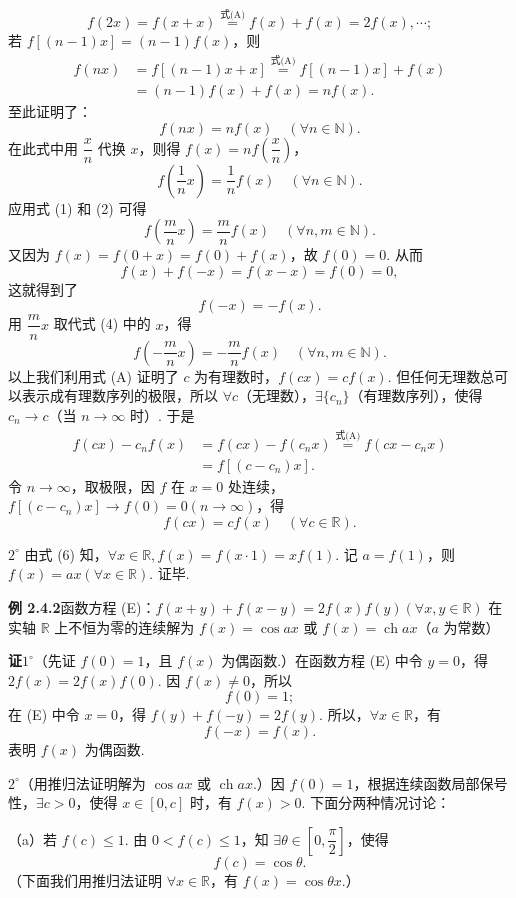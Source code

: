 \documentclass[UTF8,12pt,a4paper,fontset=fandol]{ctexart}
\begin{document}
\[
  f(2x)=f(x+x)\overset{\text{式(A)}}{=}f(x)+f(x)=2f(x),\cdots;
\]
若 $f[(n-1)x]=(n-1)f(x)$，则
\[
\begin{aligned}
f(nx)
&=f[(n-1)x+x]\overset{\text{式(A)}}{=}f[(n-1)x]+f(x)\\
&=(n-1)f(x)+f(x)=nf(x).
\end{aligned}
\]
至此证明了：
\[
  f(nx)=nf(x)\quad(\forall n\in\mathbb{N}). \tag{1}
\]
在此式中用 $\dfrac xn$ 代换 $x$，则得 $f(x)=nf\left(\dfrac xn\right)$，
\[
  f\left(\frac1nx\right)=\frac1nf(x)\quad(\forall n\in\mathbb{N}). \tag{2}
\]
应用式 (1) 和 (2) 可得
\[
  f\left(\frac mnx\right)=\frac mn f(x)\quad(\forall n,m\in\mathbb{N}). \tag{3}
\]
又因为 $f(x)=f(0+x)=f(0)+f(x)$，故 $f(0)=0$. 从而
\[
  f(x)+f(-x)=f(x-x)=f(0)=0,
\]
这就得到了
\[
  f(-x)=-f(x). \tag{4}
\]
用 $\dfrac mnx$ 取代式 (4) 中的 $x$，得
\[
  f\left(-\frac mnx\right)=-\frac mn f(x)\quad(\forall n,m\in\mathbb{N}). \tag{5}
\]
以上我们利用式 (A) 证明了 $c$ 为有理数时，$f(cx)=cf(x)$. 但任何无理数总可以表示成有理数序列的极限，所以 $\forall c$（无理数），$\exists\{c_n\}$（有理数序列），使得 $c_n\to c$（当 $n\to\infty$ 时）. 于是
\[
\begin{aligned}
f(cx)-c_nf(x)
&=f(cx)-f(c_nx)\overset{\text{式(A)}}{=}f(cx-c_nx)\\
&=f[(c-c_n)x].
\end{aligned}
\]
令 $n\to\infty$，取极限，因 $f$ 在 $x=0$ 处连续，$f[(c-c_n)x]\to f(0)=0(n\to\infty)$，得
\[
  f(cx)=cf(x)\quad(\forall c\in\mathbb{R}). \tag{6}
\]

$2^\circ$ 由式 (6) 知，$\forall x\in\mathbb{R},f(x)=f(x\cdot1)=xf(1)$. 记 $a=f(1)$，则 $f(x)=ax(\forall x\in\mathbb{R})$. 证毕.

\noindent\textbf{例 2.4.2}\quad 函数方程 (E)：$f(x+y)+f(x-y)=2f(x)f(y)(\forall x,y\in\mathbb{R})$ 在实轴 $\mathbb{R}$ 上不恒为零的连续解为 $f(x)=\cos ax$ 或 $f(x)=\operatorname{ch} ax$（$a$ 为常数）

\noindent\textbf{证}\quad $1^\circ$（先证 $f(0)=1$，且 $f(x)$ 为偶函数.）在函数方程 (E) 中令 $y=0$，得 $2f(x)=2f(x)f(0)$. 因 $f(x)\ne0$，所以
\[
  f(0)=1; \tag{1}
\]
在 (E) 中令 $x=0$，得 $f(y)+f(-y)=2f(y)$. 所以，$\forall x\in\mathbb{R}$，有
\[
  f(-x)=f(x). \tag{2}
\]
表明 $f(x)$ 为偶函数.

$2^\circ$（用推归法证明解为 $\cos ax$ 或 $\operatorname{ch} ax$.）因 $f(0)=1$，根据连续函数局部保号性，$\exists c>0$，使得 $x\in[0,c]$ 时，有 $f(x)>0$. 下面分两种情况讨论：

（a）若 $f(c)\le1$. 由 $0<f(c)\le1$，知 $\exists\theta\in\left[0,\dfrac\pi2\right]$，使得
\[
  f(c)=\cos\theta. \tag{3}
\]
（下面我们用推归法证明 $\forall x\in\mathbb{R}$，有 $f(x)=\cos\theta x$.）
\end{document}

